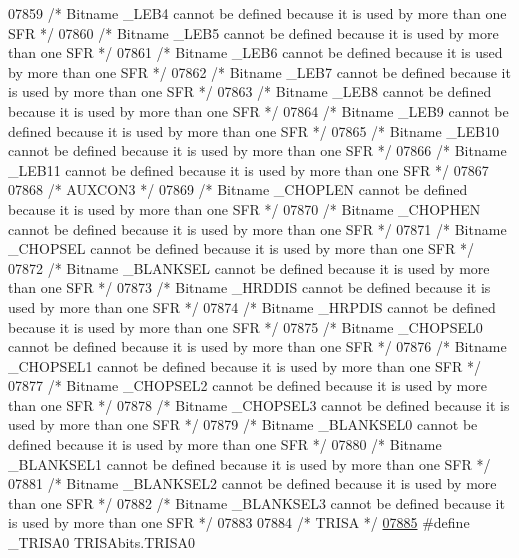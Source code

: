 \begin{DoxyCode}
07859 \textcolor{comment}{/* Bitname \_LEB4 cannot be defined because it is used by more than one SFR */}
07860 \textcolor{comment}{/* Bitname \_LEB5 cannot be defined because it is used by more than one SFR */}
07861 \textcolor{comment}{/* Bitname \_LEB6 cannot be defined because it is used by more than one SFR */}
07862 \textcolor{comment}{/* Bitname \_LEB7 cannot be defined because it is used by more than one SFR */}
07863 \textcolor{comment}{/* Bitname \_LEB8 cannot be defined because it is used by more than one SFR */}
07864 \textcolor{comment}{/* Bitname \_LEB9 cannot be defined because it is used by more than one SFR */}
07865 \textcolor{comment}{/* Bitname \_LEB10 cannot be defined because it is used by more than one SFR */}
07866 \textcolor{comment}{/* Bitname \_LEB11 cannot be defined because it is used by more than one SFR */}
07867 
07868 \textcolor{comment}{/* AUXCON3 */}
07869 \textcolor{comment}{/* Bitname \_CHOPLEN cannot be defined because it is used by more than one SFR */}
07870 \textcolor{comment}{/* Bitname \_CHOPHEN cannot be defined because it is used by more than one SFR */}
07871 \textcolor{comment}{/* Bitname \_CHOPSEL cannot be defined because it is used by more than one SFR */}
07872 \textcolor{comment}{/* Bitname \_BLANKSEL cannot be defined because it is used by more than one SFR */}
07873 \textcolor{comment}{/* Bitname \_HRDDIS cannot be defined because it is used by more than one SFR */}
07874 \textcolor{comment}{/* Bitname \_HRPDIS cannot be defined because it is used by more than one SFR */}
07875 \textcolor{comment}{/* Bitname \_CHOPSEL0 cannot be defined because it is used by more than one SFR */}
07876 \textcolor{comment}{/* Bitname \_CHOPSEL1 cannot be defined because it is used by more than one SFR */}
07877 \textcolor{comment}{/* Bitname \_CHOPSEL2 cannot be defined because it is used by more than one SFR */}
07878 \textcolor{comment}{/* Bitname \_CHOPSEL3 cannot be defined because it is used by more than one SFR */}
07879 \textcolor{comment}{/* Bitname \_BLANKSEL0 cannot be defined because it is used by more than one SFR */}
07880 \textcolor{comment}{/* Bitname \_BLANKSEL1 cannot be defined because it is used by more than one SFR */}
07881 \textcolor{comment}{/* Bitname \_BLANKSEL2 cannot be defined because it is used by more than one SFR */}
07882 \textcolor{comment}{/* Bitname \_BLANKSEL3 cannot be defined because it is used by more than one SFR */}
07883 
07884 \textcolor{comment}{/* TRISA */}
\hypertarget{a00015_source_l07885}{}\hyperlink{a00015_ad93af2aa1b2ca33654e9227e75b76e60}{07885} \textcolor{preprocessor}{#define \_TRISA0 TRISAbits.TRISA0}

\end{DoxyCode}
